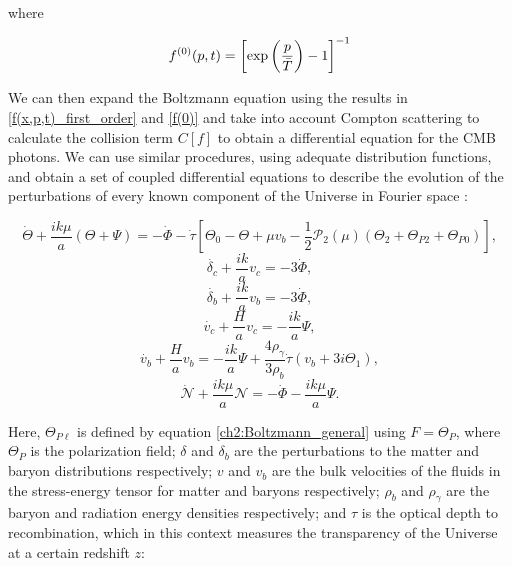 \documentclass[openany,a4paper,12pt,oneside]{book}
\begin{document}
\begin{spacing}{1.5}
\noindent where

\begin{equation}\label{f(0)}
    f^{(0)}(p,t)=\left[\text{exp}\left(\frac{p}{\Bar{T}}\right)-1\right]^{-1}
\end{equation}

We can then expand the Boltzmann equation using the results in \eqref{f(x,p,t)_first_order} and \eqref{f(0)} and take into account Compton scattering to calculate the collision term $C[f]$ to obtain a differential equation for the CMB photons. We can use similar procedures, using adequate distribution functions, and obtain a set of coupled differential equations to describe the evolution of the perturbations of every known component of the Universe in Fourier space \cite{dodelson2020modern}:

\begin{equation}\label{diff_eq_radiation_perturbs}
    \dot{\Theta}+\frac{ik\mu}{a}(\Theta+\Psi)=-\dot{\Phi}-\dot{\tau}\left[\Theta_0-\Theta+\mu v_b-\frac{1}{2}\mathcal{P}_2(\mu)(\Theta_2+\Theta_{P2}+\Theta_{P0})\right],
\end{equation}
\begin{equation}
    \dot{\delta_c}+\frac{ik}{a}v_c=-3\dot{\Phi},
\end{equation}
\begin{equation}
    \dot{\delta_b}+\frac{ik}{a}v_b=-3\dot{\Phi},
\end{equation}
\begin{equation}
    \dot{v_c}+\frac{H}{a}v_c=-\frac{ik}{a}\Psi,
\end{equation}
\begin{equation}
    \dot{v_b}+\frac{H}{a}v_b=-\frac{ik}{a}\Psi+\frac{4\rho_\gamma}{3\rho_b}\dot{\tau}(v_b+3i\Theta_1),
\end{equation}
\begin{equation}\label{diff_eqs:neutrino_perturbations}
    \dot{\mathcal{N}}+\frac{ik\mu}{a}\mathcal{N}=-\dot{\Phi}-\frac{ik\mu}{a}\Psi.
\end{equation}

Here, $\Theta_{P\ell}$ is defined by equation \eqref{ch2:Boltzmann_general} using $F=\Theta_P$, where $\Theta_P$ is the polarization field; $\delta$ and $\delta_b$ are the perturbations to the matter and baryon distributions respectively; $v$ and $v_b$ are the bulk velocities of the fluids in the stress-energy tensor for matter and baryons respectively; $\rho_b$ and $\rho_\gamma$ are the baryon and radiation energy densities respectively; and $\tau$ is the optical depth to recombination, which in this context measures the transparency of the Universe at a certain redshift $z$:	


\end{spacing}
\end{document}
